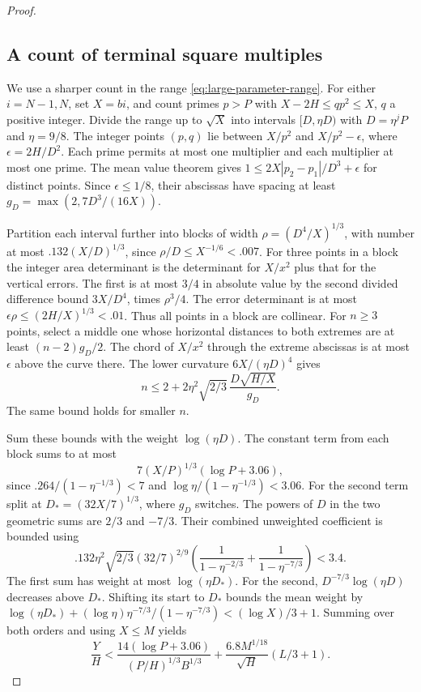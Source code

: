 \begin{proof}
\subsection*{A count of terminal square multiples}

We use a sharper count in the range \eqref{eq:large-parameter-range}.
For either \(i=N-1,N\), set \(X=bi\), and count primes \(p>P\)
with \(X-2H\le qp^2\le X\), \(q\) a positive integer.
Divide the range up to \(\sqrt X\) into intervals
\([D,\eta D)\) with \(D=\eta^j P\) and \(\eta=9/8\).
The integer points \((p,q)\) lie between \(X/p^2\) and
\(X/p^2-\epsilon\), where \(\epsilon=2H/D^2\).
Each prime permits at most one multiplier and each multiplier
at most one prime. The mean value theorem gives
\(1\le2X|p_2-p_1|/D^3+\epsilon\) for distinct points.
Since \(\epsilon\le1/8\), their abscissas have spacing at least
\(g_D=\max(2,7D^3/(16X))\).

Partition each interval further into blocks of width
\(\rho=(D^4/X)^{1/3}\), with number at most
\(.132(X/D)^{1/3}\), since \(\rho/D\le X^{-1/6}<.007\).
For three points in a block the integer area determinant
is the determinant for \(X/x^2\) plus that for the vertical
errors. The first is at most \(3/4\) in absolute value by
the second divided difference bound \(3X/D^4\), times
\(\rho^3/4\). The error determinant is at most
\(\epsilon\rho\le(2H/X)^{1/3}<.01\). Thus all points in a
block are collinear. For \(n\ge3\) points, select a middle
one whose horizontal distances to both extremes are at least
\((n-2)g_D/2\). The chord of \(X/x^2\) through the extreme
abscissas is at most \(\epsilon\) above the curve there.
The lower curvature \(6X/(\eta D)^4\) gives
\[
 n\le 2+2\eta^2\sqrt{2/3}\,
                 \frac{D\sqrt{H/X}}{g_D}.
\]
The same bound holds for smaller \(n\).

Sum these bounds with the weight \(\log(\eta D)\).
The constant term from each block sums to at most
\[
 7(X/P)^{1/3}(\log P+3.06),
\]
since \(.264/(1-\eta^{-1/3})<7\) and
\(\log\eta/(1-\eta^{-1/3})<3.06\).
For the second term split at \(D_*=(32X/7)^{1/3}\),
where \(g_D\) switches. The powers of \(D\) in the two
geometric sums are \(2/3\) and \(-7/3\).
Their combined unweighted coefficient is bounded using
\[
 .132\eta^2\sqrt{2/3}(32/7)^{2/9}
 \left(\frac1{1-\eta^{-2/3}}+\frac1{1-\eta^{-7/3}}\right)<3.4 .
\]
The first sum has weight at most \(\log(\eta D_*)\).
For the second, \(D^{-7/3}\log(\eta D)\) decreases above
\(D_*\). Shifting its start to \(D_*\) bounds the mean weight
by \(\log(\eta D_*)+(\log\eta)\eta^{-7/3}/(1-\eta^{-7/3})
<(\log X)/3+1\).
Summing over both orders and using \(X\le M\) yields
\begin{equation}\label{eq:large-square-charge}
 \frac{Y}{H}<
 \frac{14(\log P+3.06)}{(P/H)^{1/3}B^{1/3}}
 +\frac{6.8 M^{1/18}}{\sqrt H}(L/3+1).
\end{equation}


\end{proof}
